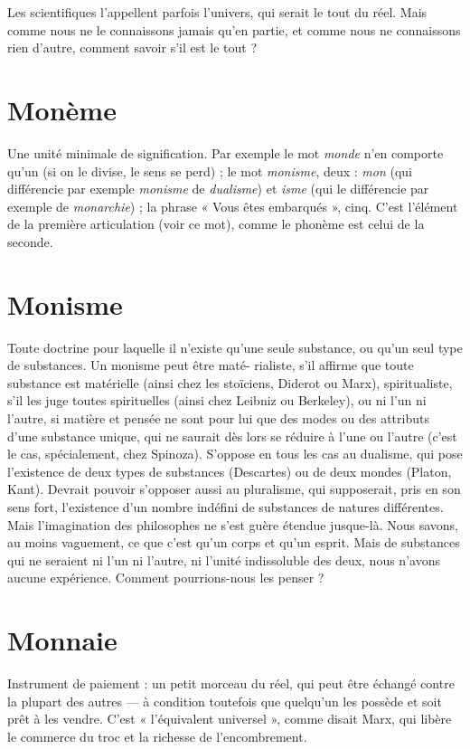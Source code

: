 Les scientifiques l’appellent parfois l’univers, qui serait le tout du réel. Mais
comme nous ne le connaissons jamais qu’en partie, et comme nous ne connaissons
rien d’autre, comment savoir s’il est le tout ?

\section{Monème}
Une unité minimale de signification. Par exemple le mot {\it monde}
n’en comporte qu’un (si on le divise, le sens se perd) ; le mot
{\it monisme}, deux : {\it mon} (qui différencie par exemple {\it monisme} de {\it dualisme}) et {\it isme}
(qui le différencie par exemple de {\it monarchie}) ; la phrase « Vous êtes embarqués »,
cinq. C’est l'élément de la première articulation (voir ce mot), comme
le phonème est celui de la seconde.

\section{Monisme}
Toute doctrine pour laquelle il n’existe qu’une seule substance,
ou qu’un seul type de substances. Un monisme peut être maté-
rialiste, s’il affirme que toute substance est matérielle (ainsi chez les stoïciens,
Diderot ou Marx), spiritualiste, s’il les juge toutes spirituelles (ainsi chez Leibniz
ou Berkeley), ou ni l’un ni l’autre, si matière et pensée ne sont pour lui que
des modes ou des attributs d’une substance unique, qui ne saurait dès lors se
réduire à l’une ou l’autre (c’est le cas, spécialement, chez Spinoza). S'oppose en
tous les cas au dualisme, qui pose l’existence de deux types de substances (Descartes)
ou de deux mondes (Platon, Kant). Devrait pouvoir s’opposer aussi au
pluralisme, qui supposerait, pris en son sens fort, l’existence d’un nombre indéfini
de substances de natures différentes. Mais l'imagination des philosophes ne
s’est guère étendue jusque-là. Nous savons, au moins vaguement, ce que c’est
qu'un corps et qu’un esprit. Mais de substances qui ne seraient ni l’un ni
l’autre, ni l'unité indissoluble des deux, nous n’avons aucune expérience. Comment
pourrions-nous les penser ?

\section{Monnaie}
Instrument de paiement : un petit morceau du réel, qui peut
être échangé contre la plupart des autres — à condition toutefois
que quelqu'un les possède et soit prêt à les vendre. C’est « l'équivalent
universel », comme disait Marx, qui libère le commerce du troc et la richesse de
l'encombrement.

